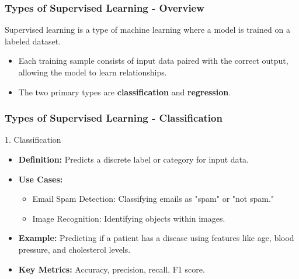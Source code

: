 \documentclass[aspectratio=169]{beamer}
\begin{document}
\begin{frame}[fragile]
    \frametitle{Types of Supervised Learning - Overview}
    Supervised learning is a type of machine learning where a model is trained on a labeled dataset. 
    \begin{itemize}
        \item Each training sample consists of input data paired with the correct output, allowing the model to learn relationships.
        \item The two primary types are \textbf{classification} and \textbf{regression}.
    \end{itemize}
\end{frame}

\begin{frame}[fragile]
    \frametitle{Types of Supervised Learning - Classification}
    \begin{block}{1. Classification}
        \begin{itemize}
            \item \textbf{Definition:} Predicts a discrete label or category for input data.
            \item \textbf{Use Cases:}
                \begin{itemize}
                    \item Email Spam Detection: Classifying emails as "spam" or "not spam."
                    \item Image Recognition: Identifying objects within images.
                \end{itemize}
            \item \textbf{Example:} 
                Predicting if a patient has a disease using features like age, blood pressure, and cholesterol levels.
            \item \textbf{Key Metrics:} Accuracy, precision, recall, F1 score.
        \end{itemize}
    \end{block}
\end{frame}
\end{document}
